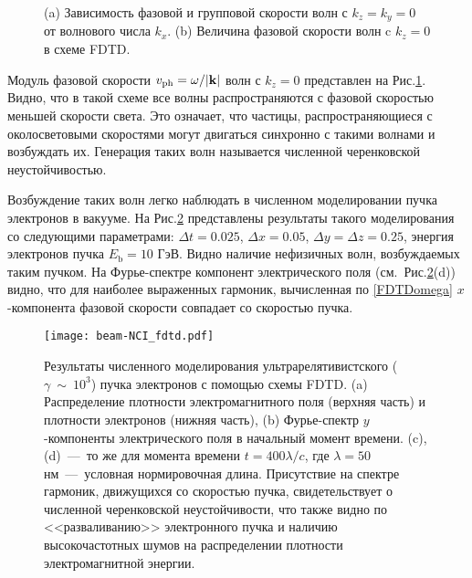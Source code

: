 \begin{figure}
    \caption{(a) Зависимость фазовой и групповой скорости волн с $k_z=k_y=0$ от волнового числа $k_x$. (b) Величина фазовой скорости волн c $k_z=0$ в схеме FDTD.}
    \label{fig:ch3/sec4/vphFDTD}
\end{figure}

\begin{figure}
    \caption{}
\end{figure}

Модуль фазовой скорости $v_\mathrm{ph} = \omega / |\vb{k}|$ волн с $k_z=0$ представлен на Рис.\ref{fig:ch3/sec4/vphFDTD}.
Видно, что в такой схеме все волны распространяются с фазовой скоростью меньшей скорости света.
Это означает, что частицы, распространяющиеся с околосветовыми скоростями могут двигаться синхронно с такими волнами и возбуждать их.
Генерация таких волн называется численной черенковской неустойчивостью. 

Возбуждение таких волн легко наблюдать в численном моделировании пучка электронов в вакууме.
На Рис.\ref{fig:ch3/sec4/FDTD_NCI} представлены результаты такого моделирования со следующими параметрами: $\Delta t = 0.025$, $\Delta x = 0.05$, $\Delta y = \Delta z = 0.25$, энергия электронов пучка $E_\mathrm{b} = 10$ ГэВ.
Видно наличие нефизичных волн, возбуждаемых таким пучком.
На Фурье-спектре компонент электрического поля (см.~Рис.\ref{fig:ch3/sec4/FDTD_NCI}\;(d)) видно, что для наиболее выраженных гармоник, вычисленная по \eqref{FDTDomega} $x$-компонента фазовой скорости совпадает со скоростью пучка.

\begin{figure}[ht]
	\texttt{[image: beam-NCI\_fdtd.pdf]} 
	\caption[Результаты численного моделирования ультрарелятивистского ($\gamma~\sim~10^3$) пучка электронов с помощью схемы FDTD]{\label{fig:ch3/sec4/FDTD_NCI} Результаты численного моделирования ультрарелятивистского ($\gamma~\sim~10^3$) пучка электронов с помощью схемы FDTD. (a) Распределение плотности электромагнитного поля (верхняя часть) и плотности электронов (нижняя часть), (b) Фурье-спектр $y$-компоненты электрического поля в начальный момент времени. (c), (d)~---~то же для момента времени $t=400\lambda/c$, где $\lambda=50$ нм~---~условная нормировочная длина.
    Присутствие на спектре гармоник, движущихся со скоростью пучка, свидетельствует о численной черенковской неустойчивости, что также видно по <<разваливанию>> электронного пучка и наличию высокочастотных шумов на распределении плотности электромагнитной энергии.}
\end{figure}

